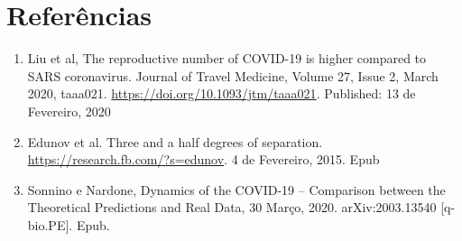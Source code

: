 \documentclass[11pt]{article}
\begin{document}
\section{Referências}
\label{sec:org819cf86}
\begin{enumerate}
\item Liu et al, The reproductive number of COVID-19 is higher compared to SARS coronavirus. Journal of Travel Medicine, Volume 27, Issue 2, March 2020, taaa021. \url{https://doi.org/10.1093/jtm/taaa021}. Published: 13 de Fevereiro, 2020
\item Edunov et al. Three and a half degrees of separation. \url{https://research.fb.com/?s=edunov}. 4 de Fevereiro, 2015. Epub
\item Sonnino e Nardone, Dynamics of the COVID-19 -- Comparison between the Theoretical Predictions and Real Data, 30 Março, 2020. arXiv:2003.13540 [q-bio.PE]. Epub.
\end{enumerate}
\end{document}
